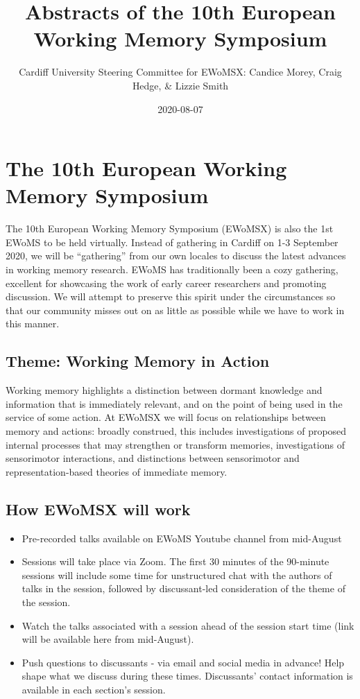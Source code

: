 \documentclass[
  12pt,
]{book}
\title{Abstracts of the 10th European Working Memory Symposium}
\author{Cardiff University Steering Committee for EWoMSX: Candice Morey, Craig Hedge, \& Lizzie Smith}
\date{2020-08-07}
\begin{document}
\maketitle

{
\setcounter{tocdepth}{1}
\tableofcontents
}
\hypertarget{the-10th-european-working-memory-symposium}{%
\chapter{The 10th European Working Memory Symposium}\label{the-10th-european-working-memory-symposium}}

The 10th European Working Memory Symposium (EWoMSX) is also the 1st EWoMS to be held virtually. Instead of gathering in Cardiff on 1-3 September 2020, we will be ``gathering'' from our own locales to discuss the latest advances in working memory research. EWoMS has traditionally been a cozy gathering, excellent for showcasing the work of early career researchers and promoting discussion. We will attempt to preserve this spirit under the circumstances so that our community misses out on as little as possible while we have to work in this manner.

\hypertarget{theme-working-memory-in-action}{%
\section{Theme: Working Memory in Action}\label{theme-working-memory-in-action}}

Working memory highlights a distinction between dormant knowledge and information that is immediately relevant, and on the point of being used in the service of some action. At EWoMSX we will focus on relationships between memory and actions: broadly construed, this includes investigations of proposed internal processes that may strengthen or transform memories, investigations of sensorimotor interactions, and distinctions between sensorimotor and representation-based theories of immediate memory.

\hypertarget{how-ewomsx-will-work}{%
\section{How EWoMSX will work}\label{how-ewomsx-will-work}}

\begin{itemize}
\item
  Pre-recorded talks available on EWoMS Youtube channel from mid-August
\item
  Sessions will take place via Zoom. The first 30 minutes of the 90-minute sessions will include some time for unstructured chat with the authors of talks in the session, followed by discussant-led consideration of the theme of the session.
\item
  Watch the talks associated with a session ahead of the session start time (link will be available here from mid-August).
\item
  Push questions to discussants - via email and social media in advance! Help shape what we discuss during these times. Discussants' contact information is available in each section's session.
\end{itemize}
\end{document}
